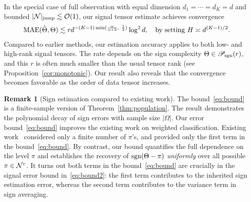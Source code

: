 \documentclass[twoside,11pt]{article}
\theoremstyle{definition}
\newtheorem{rmk}{Remark}
\def\sign{\textup{sgn}}
\def\caliP{\mathscr{P}_{\textup{sgn}}}
\begin{document}
In the special case of full observation with equal dimension $d_1=\cdots=d_K=d$ and bounded $|\mathcal{N}|_{\text{jump}}\lesssim \mathcal{O}(1)$, our signal tensor estimate achieves convergence
\begin{equation}\label{eq:special}
\textup{MAE}(\hat \Theta, \Theta)\lesssim rd^{-(K-1)\min({\alpha\over \alpha+2},\ {1\over 2})}\log^2 d, \quad \text{by setting}\ H\asymp d^{(K-1)/2}.
\end{equation}
Compared to earlier methods, our estimation accuracy applies to both low- and high-rank signal tensors. The rate depends on the sign complexity $\Theta\in\caliP(r)$, and this $r$ is often much smaller than the usual tensor rank (see Proposition~\ref{cor:monotonic}). Our result also reveals that the convergence becomes favorable as the order of data tensor increases. 



\begin{rmk}[Sign estimation compared to existing work]
The bound~\eqref{eq:bound} is a finite-sample version of Theorem~\ref{thm:population}. The result demonstrates the polynomial decay of sign errors with sample size $|\Omega|$. 
Our error bound~\eqref{eq:bound} improves the existing work on weighted classification. Existing work~\citep{tsybakov2004optimal,xu2020class} considered only a finite number of $\pi$'s, and provided only the first term in the bound~\eqref{eq:bound}. By contrast, our bound quantifies the full dependence on the level $\pi$ and establishes the recovery of $\sign(\Theta-\pi)$ \emph{uniformly} over all possible $\pi\in\mathcal{N}^c$. It turns out both terms in the bound~\eqref{eq:bound} are crucially in the signal error bound in~\eqref{eq:bound2}: the first term contributes to the inherited sign estimation error, whereas the second term contributes to the variance term in sign averaging. 
\end{rmk}

\end{document}
